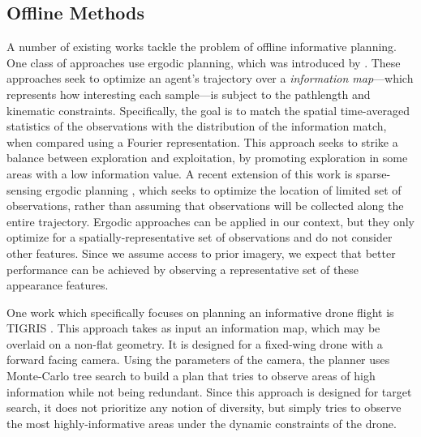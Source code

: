 \subsection{Offline Methods}
%
A number of existing works tackle the problem of offline informative planning. One class of approaches use ergodic planning, which was introduced by \cite{ergodic2011}. These approaches seek to optimize an agent's trajectory over a \textit{information map}---which represents how interesting each sample---is subject to the pathlength and kinematic constraints. Specifically, the goal is to match the spatial time-averaged statistics of the observations with the distribution of the information match, when compared using a Fourier representation. This approach seeks to strike a balance between exploration and exploitation, by promoting exploration in some areas with a low information value.
A recent extension of this work is sparse-sensing ergodic planning \cite{Rao}, which seeks to optimize the location of limited set of observations, rather than assuming that observations will be collected along the entire trajectory. Ergodic approaches can be applied in our context, but they only optimize for a spatially-representative set of observations and do not consider other features. Since we assume access to prior imagery, we expect that better performance can be achieved by observing a representative set of these appearance features. 

One work which specifically focuses on planning an informative drone flight is TIGRIS \cite{Moon2022TIGRIS:Planning}. This approach takes as input an information map, which may be overlaid on a non-flat geometry. It is designed for a fixed-wing drone with a forward facing camera. Using the parameters of the camera, the planner uses Monte-Carlo tree search to build a plan that tries to observe areas of high information while not being redundant. Since this approach is designed for target search, it does not prioritize any notion of diversity, but simply tries to observe the most highly-informative areas under the dynamic constraints of the drone. 

